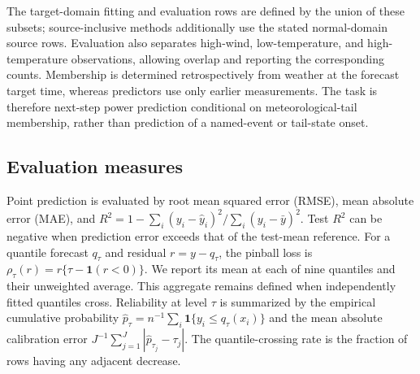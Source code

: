 {\color{blue}The target-domain fitting and evaluation rows are defined by the union of these subsets; source-inclusive methods additionally use the stated normal-domain source rows. Evaluation also separates high-wind, low-temperature, and high-temperature observations, allowing overlap and reporting the corresponding counts. Membership is determined retrospectively from weather at the forecast target time, whereas predictors use only earlier measurements. The task is therefore next-step power prediction conditional on meteorological-tail membership, rather than prediction of a named-event or tail-state onset.}



\subsection{Evaluation measures}\label{sec:setup}

{\color{blue}Point prediction is evaluated by root mean squared error (RMSE), mean absolute error (MAE), and $R^2=1-\sum_i(y_i-\hat y_i)^2/\sum_i(y_i-\bar y)^2$. Test $R^2$ can be negative when prediction error exceeds that of the test-mean reference. For a quantile forecast $q_\tau$ and residual $r=y-q_\tau$, the pinball loss is $\rho_\tau(r)=r\{\tau-\mathbf{1}(r<0)\}$. We report its mean at each of nine quantiles and their unweighted average. This aggregate remains defined when independently fitted quantiles cross. Reliability at level $\tau$ is summarized by the empirical cumulative probability $\widehat p_\tau=n^{-1}\sum_i\mathbf{1}\{y_i\le q_\tau(x_i)\}$ and the mean absolute calibration error $J^{-1}\sum_{j=1}^J|\widehat p_{\tau_j}-\tau_j|$. The quantile-crossing rate is the fraction of rows having any adjacent decrease.}

